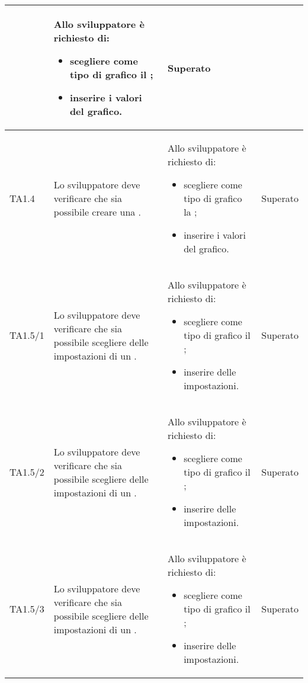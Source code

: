 \begin{longtabu}{| X[0.5] | X | X | X[0.5] |}
		& Allo sviluppatore è richiesto di:
		\begin{itemize}
			\item scegliere come tipo di grafico il ;
			\item inserire i valori del grafico.
		\end{itemize}
& Superato \\ \hline

	TA1.4 & Lo sviluppatore deve verificare che sia possibile creare una .

		& Allo sviluppatore è richiesto di:
		\begin{itemize}
			\item scegliere come tipo di grafico la ;
			\item inserire i valori del grafico.
		\end{itemize}
& Superato \\ \hline

	TA1.5/1 & Lo sviluppatore deve verificare che sia possibile scegliere delle impostazioni di un .

		& Allo sviluppatore è richiesto di:
		\begin{itemize}
			\item scegliere come tipo di grafico il ;
			\item inserire delle impostazioni.
		\end{itemize}
& Superato \\ \hline

	TA1.5/2 & Lo sviluppatore deve verificare che sia possibile scegliere delle impostazioni di un .

		& Allo sviluppatore è richiesto di:
		\begin{itemize}
			\item scegliere come tipo di grafico il ;
			\item inserire delle impostazioni.
		\end{itemize}
& Superato \\ \hline

	TA1.5/3 & Lo sviluppatore deve verificare che sia possibile scegliere delle impostazioni di un .

		& Allo sviluppatore è richiesto di:
		\begin{itemize}
			\item scegliere come tipo di grafico il ;
			\item inserire delle impostazioni.
		\end{itemize}
& Superato \\ \hline


\end{longtabu}
